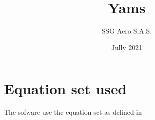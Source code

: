 \documentclass{report}
\begin{document}
    \title{Yams}
    \author{SSG Aero S.A.S.}
    \date{Jully 2021}
    \maketitle
    \chapter{Equation set used}
    The sofware use the equation set as defined in \cite{Novak77}
    
    
\end{document}
